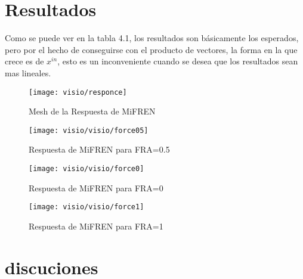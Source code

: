 \section{Resultados}
Como se puede ver en la tabla 4.1, los resultados son básicamente los esperados,  pero por el hecho de conseguirse con el producto de vectores, la forma en la que crece es de $x^{in}$, esto es un inconveniente cuando se desea que los resultados sean mas lineales.


\begin{figure}[h]
	\centering
	\texttt{[image: visio/responce]}
	\caption{Mesh de la Respuesta de MiFREN}
	\label{fig:responce}
\end{figure}

\begin{figure}[h]
	\centering
	\texttt{[image: visio/visio/force05]}
		\caption{Respuesta de MiFREN para FRA=0.5}
	\label{fig:force0}
\end{figure}
\begin{figure}[h]
	\centering
	\texttt{[image: visio/visio/force0]}
		\caption{Respuesta de MiFREN para FRA=0}
	\label{fig:force05}
\end{figure}
\begin{figure}[h]
	\centering
	\texttt{[image: visio/visio/force1]}
	\caption{Respuesta de MiFREN para FRA=1}
	\label{fig:force1}
\end{figure}

\section{discuciones}




